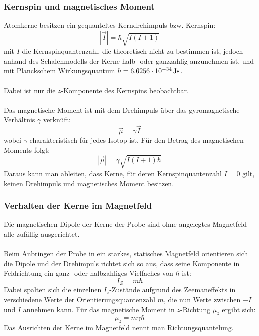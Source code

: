 \documentclass[a4paper,titlepage]{scrartcl}
\numberwithin{equation}{section}
\begin{document}
\subsubsection{Kernspin und magnetisches Moment}
Atomkerne besitzen ein gequanteltes Kerndrehimpuls bzw. Kernspin:
\begin{equation*}
|\vec{I}|=\hbar\sqrt{I(I+1)}
\end{equation*}
mit $I$ die Kernspinquantenzahl, die theoretisch nicht zu bestimmen ist, jedoch anhand des Schalenmodells der Kerne halb- oder ganzzahlig anzunehmen ist, und mit Planckschem Wirkungsquantum $\hbar=\unit[6.6256 \cdot 10^{-34}]{Js}$.\\ \\
Dabei ist nur die $z$-Komponente des Kernspins beobachtbar.\\ \\
Das magnetische Moment ist mit dem Drehimpuls über das gyromagnetische Verhältnis $\gamma$ verknüft:
\begin{equation*}
\vec{\mu}=\gamma \vec{I}
\end{equation*}
wobei $\gamma$ charakteristisch für jedes Isotop ist. Für den Betrag des magnetischen Moments folgt:
\begin{equation*}
|\vec{\mu}|=\gamma \sqrt{I(I+1) \hbar}
\end{equation*}
Daraus kann man ableiten, dass Kerne, für deren Kernspinquantenzahl $I=0$ gilt, keinen Drehimpuls und magnetisches Moment besitzen.
\subsubsection{Verhalten der Kerne im Magnetfeld}
Die magnetischen Dipole der Kerne der Probe sind ohne angelegtes Magnetfeld alle zufällig ausgerichtet.\\ \\
Beim Anbringen der Probe in ein starkes, statisches Magnetfeld orientieren sich die Dipole und der Drehimpuls richtet sich so aus, dass seine Komponente in Feldrichtung ein ganz- oder halbzahliges Vielfaches von $\hbar$ ist:
\begin{equation*}
I_Z=m \hbar
\end{equation*}
Dabei spalten sich die einzelnen $I_z$-Zustände aufgrund des Zeemaneffekts in verschiedene Werte der Orientierungsquantenzahl $m$, die nun Werte zwischen $-I$ und $I$ annehmen kann. Für das magnetische Moment in $z$-Richtung $\mu_z$ ergibt sich:
\begin{equation*}
\mu_z=m \gamma \hbar
\end{equation*}
Das Ausrichten der Kerne im Magnetfeld nennt man Richtungsquantelung.
\end{document}

